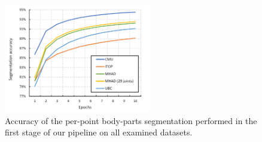 \begin{figure}[H]
\begin{center}
\centering
\includegraphics[height=180px]{images/results/segmentation_acc.png}
\caption[Accuracy of the body-parts segmentation of our method.]{Accuracy of the per-point body-parts segmentation performed in the first stage of our pipeline on all examined datasets.}
\label{fig:seg_acc}
\end{center}
\end{figure}
